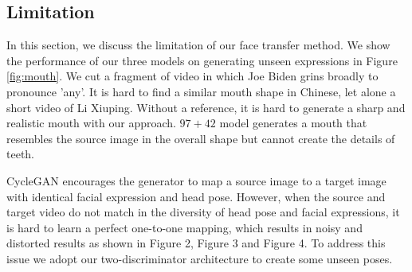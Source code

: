 \documentclass[letterpaper]{article} %
\newcommand{\zhiming}[1]{{\bf \color{blue} [Zhiming says: #1]}}
\begin{document}
	\iffalse
	\begin{figure}[t]
		\centering
		\vspace{0pt}
		\texttt{[image: figures/raise3\_final-crop.pdf]}\\
		\caption{The first column are three source frames in succession. The other columns are results of different models. $97+97$ model generates distorted faces. $42+42$ and $97+42$ model generate similar result. } \label{fig:raise}
		\vspace{0pt}
	\end{figure}
	
	\begin{figure}[t]
		\centering
		\vspace{0pt}
		\texttt{[image: figures/deformation2-crop.pdf]}\\
		\caption{The first column are three frames in succession. $97+97$ model fails to generate clear images. $42+42$ model generates much better images but results in abrupt deformation. $97+42$ model alleviates the deformation and achieves images close to real images.} 
		\label{fig:deformation}
		\vspace{0pt}
	\end{figure}
	\fi
	
	\subsection{Limitation}
	
	In this section, we discuss the limitation of our face transfer method. We show the performance of our three models on generating unseen expressions in Figure \ref{fig:mouth}. We cut a fragment of video in which Joe Biden grins broadly to pronounce 'any'. It is hard to find a similar mouth shape in Chinese, let alone a short video of Li Xiuping. Without a reference, it is hard to generate a sharp and realistic mouth with our approach. $97+42$ model generates a mouth that resembles the source image in the overall shape but cannot create the details of teeth. 
	
	CycleGAN encourages the generator to map a source image to a target image with identical facial expression and head pose. However, when the source and target video do not match in the diversity of head pose and facial expressions, it is hard to learn a perfect one-to-one mapping, which results in noisy and distorted results as shown in Figure 2, Figure 3 and Figure 4. To address this issue we adopt our two-discriminator architecture to create some unseen poses. 
	
\end{document}
